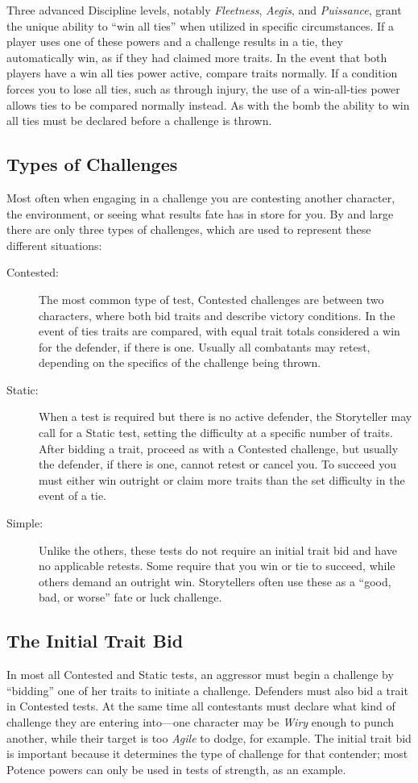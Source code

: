 Three advanced Discipline levels, notably \emph{Fleetness}, \emph{Aegis}, and \emph{Puissance}, grant the 
unique ability to ``win all ties'' when utilized in specific circumstances.  If a player uses one of 
these powers and a challenge results in a tie, they automatically win, as if they had claimed more traits.  
In the event that both players have a win all ties power active, compare traits normally.  If a condition 
forces you to lose all ties, such as through injury, the use of a win-all-ties power allows ties to be 
compared normally instead.  As with the bomb the ability to win all ties must be declared before a challenge 
is thrown.

\subsection{Types of Challenges}
Most often when engaging in a challenge you are contesting another character, the environment, 
or seeing what results fate has in store for you.  By and large there are only three types of 
challenges, which are used to represent these different situations:

\begin{description}
	\item[Contested:]  The most common type of test, Contested challenges are between two characters, 
	where both bid traits and describe victory conditions.  In the event of ties traits are compared, 
	with equal trait totals considered a win for the defender, if there is one.  Usually all combatants 
	may retest, depending on the specifics of the challenge being thrown.
	\item[Static:]  When a test is required but there is no active defender, the Storyteller 
	may call for a Static test, setting the difficulty at a specific number of traits.  After 
	bidding a trait, proceed as with a Contested challenge, but usually the defender, if there 
	is one, cannot retest or cancel you.  To succeed you must either win outright or claim more 
	traits than the set difficulty in the event of a tie.
	\item[Simple:]  Unlike the others, these tests do not require an initial trait bid and 
	have no applicable retests.  Some require that you win or tie to succeed, while others 
	demand an outright win.  Storytellers often use these as a ``good, bad, or worse'' fate 
	or luck challenge.
\end{description}

\subsection{The Initial Trait Bid}
In most all Contested and Static tests, an aggressor must begin a challenge by ``bidding'' one of 
her traits to initiate a challenge.  Defenders must also bid a trait in Contested tests.  At the same time 
all contestants must declare what kind of challenge they are entering into---one character may be \emph{Wiry} 
enough to punch another, while their target is too \emph{Agile} to dodge, for example.  The initial trait bid 
is important because it determines the type of challenge for that contender; most Potence powers can only be 
used in tests of strength, as an example.

